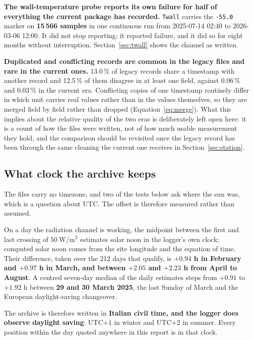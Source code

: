 \documentclass[11pt,a4paper]{article}
\begin{document}
\textbf{The wall-temperature probe reports its own failure for half of everything the current package has recorded.} \texttt{Twall} carries the \texttt{-55.0} marker on \textbf{15\,566 samples} in one continuous run from 2025-07-14 02:40 to 2026-03-06 12:00. It did not stop reporting; it reported failure, and it did so for eight months without interruption. Section~\ref{sec:twall} shows the channel as written.

\textbf{Duplicated and conflicting records are common in the legacy files and rare in the current ones.} 13.0\,\% of legacy records share a timestamp with another record and 12.5\,\% of them disagree in at least one field, against 0.06\,\% and 0.03\,\% in the current era. Conflicting copies of one timestamp routinely differ in which unit carries real values rather than in the values themselves, so they are merged field by field rather than dropped (Equation~\eqref{eq:merge}). What this implies about the relative quality of the two eras is deliberately left open here: it is a count of how the files were written, not of how much usable measurement they hold, and the comparison should be revisited once the legacy record has been through the same cleaning the current one receives in Section~\ref{sec:station}.

\subsection{What clock the archive keeps}
\label{sec:clock}

The files carry no timezone, and two of the tests below ask where the sun was, which is a question about UTC. The offset is therefore measured rather than assumed.

On a day the radiation channel is working, the midpoint between the first and last crossing of $50\ \mathrm{W/m^2}$ estimates solar noon in the logger's own clock; computed solar noon comes from the site longitude and the equation of time. Their difference, taken over the 212 days that qualify, is \textbf{$+0.94$ h in February and $+0.97$ h in March, and between $+2.05$ and $+2.23$ h from April to August}. A centred seven-day median of the daily estimates steps from $+0.91$ to $+1.92$ h between \textbf{29 and 30 March 2025}, the last Sunday of March and the European daylight-saving changeover.

The archive is therefore written in \textbf{Italian civil time, and the logger does observe daylight saving}: UTC$+1$ in winter and UTC$+2$ in summer. Every position within the day quoted anywhere in this report is in that clock.
\end{document}
